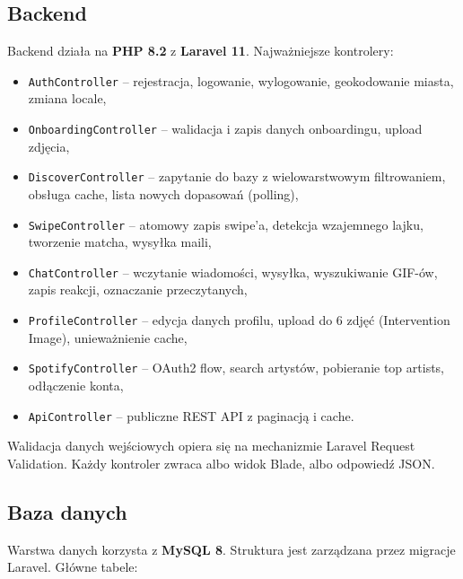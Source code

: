 \documentclass[12pt,a4paper]{article}
\begin{document}
\subsection{Backend}

Backend działa na \textbf{PHP 8.2} z \textbf{Laravel 11}. Najważniejsze kontrolery:

\begin{itemize}
    \item \texttt{AuthController} -- rejestracja, logowanie, wylogowanie, geokodowanie miasta, zmiana locale,
    \item \texttt{OnboardingController} -- walidacja i zapis danych onboardingu, upload zdjęcia,
    \item \texttt{DiscoverController} -- zapytanie do bazy z wielowarstwowym filtrowaniem, obsługa cache, lista nowych dopasowań (polling),
    \item \texttt{SwipeController} -- atomowy zapis swipe'a, detekcja wzajemnego lajku, tworzenie matcha, wysyłka maili,
    \item \texttt{ChatController} -- wczytanie wiadomości, wysyłka, wyszukiwanie GIF-ów, zapis reakcji, oznaczanie przeczytanych,
    \item \texttt{ProfileController} -- edycja danych profilu, upload do 6 zdjęć (Intervention Image), unieważnienie cache,
    \item \texttt{SpotifyController} -- OAuth2 flow, search artystów, pobieranie top artists, odłączenie konta,
    \item \texttt{ApiController} -- publiczne REST API z paginacją i cache.
\end{itemize}

Walidacja danych wejściowych opiera się na mechanizmie Laravel Request Validation. Każdy kontroler zwraca albo widok Blade, albo odpowiedź JSON.

\subsection{Baza danych}

Warstwa danych korzysta z \textbf{MySQL 8}. Struktura jest zarządzana przez migracje Laravel. Główne tabele:
\end{document}
